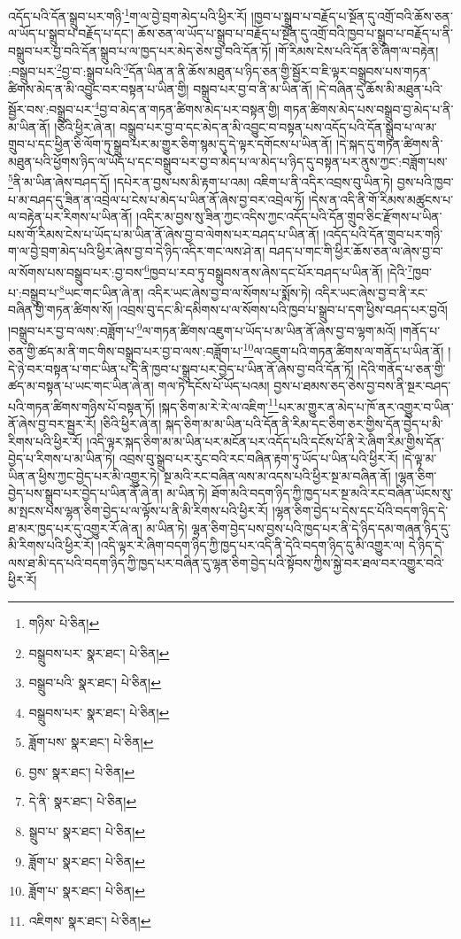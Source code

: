 འདོད་པའི་དོན་སྒྲུབ་པར་གཉི་\footnote{གཉིས་  པེ་ཅིན། }ག་ལ་བྱེ་བྲག་མེད་པའི་ཕྱིར་རོ། །ཁྱབ་པ་སྒྲུབ་པ་བརྗོད་པ་སྔོན་དུ་འགྲོ་བའི་ཆོས་ཅན་ལ་ཡོད་པ་སྒྲུབ་པ་བརྗོད་པ་དང་། ཆོས་ཅན་ལ་ཡོད་པ་སྒྲུབ་པ་བརྗོད་པ་སྔོན་དུ་འགྲོ་བའི་ཁྱབ་པ་སྒྲུབ་པ་བརྗོད་པ་ནི་བསྒྲུབ་པར་བྱ་བའི་དོན་སྒྲུབ་པ་ལ་ཁྱད་པར་མེད་ཅེས་བྱ་བའི་དོན་ཏོ། །གོ་རིམས་ངེས་པའི་དོན་ཅི་ཞིག་ལ་བརྟེན། :བསྒྲུབ་པར་\footnote{བསྒྲུབས་པར་  སྣར་ཐང་།  པེ་ཅིན། }བྱ་བ་:སྒྲུབ་པའི་\footnote{བསྒྲུབ་པའི་  སྣར་ཐང་།  པེ་ཅིན། }དོན་ཡིན་ན་ནི་ཆོས་མཐུན་པ་ཉིད་ཅན་གྱི་སྦྱོར་བ་ཇི་ལྟར་བསྒྲུབས་པས་གཏན་ཚིགས་མེད་ན་མི་འབྱུང་བར་བསྟན་པ་ཡིན་གྱི། བསྒྲུབ་པར་བྱ་བ་ནི་མ་ཡིན་ནོ། །དེ་བཞིན་དུ་ཆོས་མི་མཐུན་པའི་སྦྱོར་བས་:བསྒྲུབ་པར་\footnote{བསྒྲུབས་པར་  སྣར་ཐང་།  པེ་ཅིན། }བྱ་བ་མེད་ན་གཏན་ཚིགས་མེད་པར་བསྟན་གྱི། གཏན་ཚིགས་མེད་པས་བསྒྲུབ་བྱ་མེད་པ་ནི་མ་ཡིན་ནོ། །ཅིའི་ཕྱིར་ཞེ་ན། བསྒྲུབ་པར་བྱ་བ་དང་མེད་ན་མི་འབྱུང་བ་བསྟན་པས་འདོད་པའི་དོན་སྒྲུབ་པ་ལ་མ་གྲུབ་པ་དང་ཕྱིན་ཅི་ལོག་ཏུ་སྒྲུབ་པར་མ་གྱུར་ཅིག་སྙམ་དུ་དེ་ལྟར་དགོངས་པ་ཡིན་ནོ། །དེ་སྐད་དུ་གཏན་ཚིགས་ནི་མཐུན་པའི་ཕྱོགས་ཉིད་ལ་ཡོད་པ་དང་བསྒྲུབ་པར་བྱ་བ་མེད་པ་ལ་མེད་པ་ཉིད་དུ་བསྟན་པར་ནུས་ཀྱང་:བཟློག་པས་\footnote{ཟློག་པས་  སྣར་ཐང་།  པེ་ཅིན། }ནི་མ་ཡིན་ཞེས་བཤད་དོ། །དཔེར་ན་བྱས་པས་མི་རྟག་པ་འམ། འཇིག་པ་ནི་འདིར་འབྲས་བུ་ཡིན་ཏེ། བྱས་པའི་ཁྱབ་པ་མ་བཤད་དུ་ཟིན་ན་འབྲེལ་པ་ངེས་པ་མེད་པ་ཡིན་ནོ་ཞེས་བྱ་བར་འབྲེལ་ཏོ། །དེས་ན་འདི་ནི་གོ་རིམས་མཚུངས་པ་ལ་བརྟེན་པར་རིགས་པ་ཡིན་ནོ། །འདིར་མ་བྱས་སུ་ཟིན་ཀྱང་འདིས་ཀྱང་འདོད་པའི་དོན་གྲུབ་ཅིང་རྫོགས་པ་ཡིན་པས་གོ་རིམས་ངེས་པ་ཡོད་པ་མ་ཡིན་ནོ་ཞེས་བྱ་བ་ལེགས་པར་བཤད་པ་ཡིན་ནོ། །འདོད་པའི་དོན་གྲུབ་པར་གཉི་ག་ལ་བྱེ་བྲག་མེད་པའི་ཕྱིར་ཞེས་བྱ་བ་དེ་ཉིད་འདིར་གང་ལས་ཤེ་ན། བཤད་པ་གང་གི་ཕྱིར་ཆོས་ཅན་ལ་ཞེས་བྱ་བ་ལ་སོགས་པས་བསྒྲུབ་པར་:བྱ་བས་\footnote{བྱས་  སྣར་ཐང་།  པེ་ཅིན། }ཁྱབ་པ་རབ་ཏུ་བསྒྲུབས་ནས་ཞེས་དང་པོར་བཤད་པ་ཡིན་ནོ། །དེའི་\footnote{དེ་ནི་  སྣར་ཐང་།  པེ་ཅིན། }ཁྱབ་པ་:བསྒྲུབ་པ་\footnote{སྒྲུབ་པ་  སྣར་ཐང་།  པེ་ཅིན། }ཡང་གང་ཡིན་ཞེ་ན། འདིར་ཡང་ཞེས་བྱ་བ་ལ་སོགས་པ་སྨོས་ཏེ། འདིར་ཡང་ཞེས་བྱ་བ་ནི་རང་བཞིན་གྱི་གཏན་ཚིགས་སོ། །འབྲས་བུ་དང་མི་དམིགས་པ་ལ་སོགས་པའི་ཁྱབ་པ་སྒྲུབ་པ་དག་ཕྱིས་བཤད་པར་བྱའོ། །བསྒྲུབ་པར་བྱ་བ་ལས་:བཟློག་པ་\footnote{ཟློག་པ་  སྣར་ཐང་།  པེ་ཅིན། }ལ་གཏན་ཚིགས་འཇུག་པ་ཡོད་པ་མ་ཡིན་ནོ་ཞེས་བྱ་བ་ལྷག་མའོ། །གནོད་པ་ཅན་གྱི་ཚད་མ་ནི་གང་གིས་བསྒྲུབ་པར་བྱ་བ་ལས་:བཟློག་པ་\footnote{ཟློག་པ་  སྣར་ཐང་།  པེ་ཅིན། }ལ་འཇུག་པའི་གཏན་ཚིགས་ལ་གནོད་པ་ཡིན་ནོ། །དེ་ཉེ་བར་བསྟན་པ་གང་ཡིན་པ་དེ་ནི་ཁྱབ་པ་སྒྲུབ་པར་བྱེད་པ་ཡིན་ནོ་ཞེས་བྱ་བའི་དོན་ཏོ། །དེའི་གནོད་པ་ཅན་གྱི་ཚད་མ་བསྟན་པ་ཡང་གང་ཡིན་ཞེ་ན། གལ་ཏེ་དངོས་པོ་ཡོད་པའམ། བྱས་པ་ཐམས་ཅད་ཅེས་བྱ་བས་ནི་སྔར་བཤད་པའི་གཏན་ཚིགས་གཉིས་པོ་བསྟན་ཏོ། །སྐད་ཅིག་མ་རེ་རེ་ལ་འཇིག་\footnote{འཇིགས་  སྣར་ཐང་།  པེ་ཅིན། }པར་མ་གྱུར་ན་མེད་པ་ཁོ་ནར་འགྱུར་བ་ཡིན་ནོ་ཞེས་བྱ་བར་སྦྱར་རོ། །ཅིའི་ཕྱིར་ཞེ་ན། སྐད་ཅིག་མ་མ་ཡིན་པའི་དོན་ནི་རིམ་དང་ཅིག་ཅར་གྱིས་དོན་བྱེད་པ་མི་རིགས་པའི་ཕྱིར་རོ། །འདི་ལྟར་སྐད་ཅིག་མ་མ་ཡིན་པར་མངོན་པར་འདོད་པའི་དངོས་པོ་ནི་རེ་ཞིག་རིམ་གྱིས་དོན་བྱེད་པ་རིགས་པ་མ་ཡིན་ཏེ། འབྲས་བུ་སྒྲུབ་པར་རུང་བའི་རང་བཞིན་རྟག་ཏུ་ཡོད་པ་ཡིན་པའི་ཕྱིར་རོ། །དེ་ལྟ་མ་ཡིན་ན་ཕྱིས་ཀྱང་བྱེད་པར་མི་འགྱུར་ཏེ། སྔ་མའི་རང་བཞིན་ལས་མ་འདས་པའི་ཕྱིར་སྔ་མ་བཞིན་ནོ། །ལྷན་ཅིག་བྱེད་པས་སྒྲུབ་པར་བྱེད་པ་ཡིན་ནོ་ཞེ་ན། མ་ཡིན་ཏེ། ཐོག་མའི་བདག་ཉིད་ཀྱི་ཁྱད་པར་སྔ་མའི་རང་བཞིན་ཡོངས་སུ་མ་སྤངས་པས་ལྷན་ཅིག་བྱེད་པ་ལ་ལྟོས་པ་ནི་མི་རིགས་པའི་ཕྱིར་རོ། །ལྷན་ཅིག་བྱེད་པ་དེས་དང་པོའི་བདག་ཉིད་དེ་ཐ་མར་ཁྱད་པར་དུ་འགྱུར་རོ་ཞེ་ན། མ་ཡིན་ཏེ། ལྷན་ཅིག་བྱེད་པས་བྱས་པའི་ཁྱད་པར་ནི་དེ་ཉིད་དམ་གཞན་ཉིད་དུ་མི་རིགས་པའི་ཕྱིར་རོ། །འདི་ལྟར་རེ་ཞིག་བདག་ཉིད་ཀྱི་ཁྱད་པར་འདི་ནི་དེའི་བདག་ཉིད་དུ་མི་འགྱུར་ལ། དེ་ཉིད་དེ་ལས་ཐ་མི་དད་པའི་བདག་ཉིད་ཀྱི་ཁྱད་པར་བཞིན་དུ་ལྷན་ཅིག་བྱེད་པའི་སྟོབས་ཀྱིས་སྐྱེ་བར་ཐལ་བར་འགྱུར་བའི་ཕྱིར་རོ། 